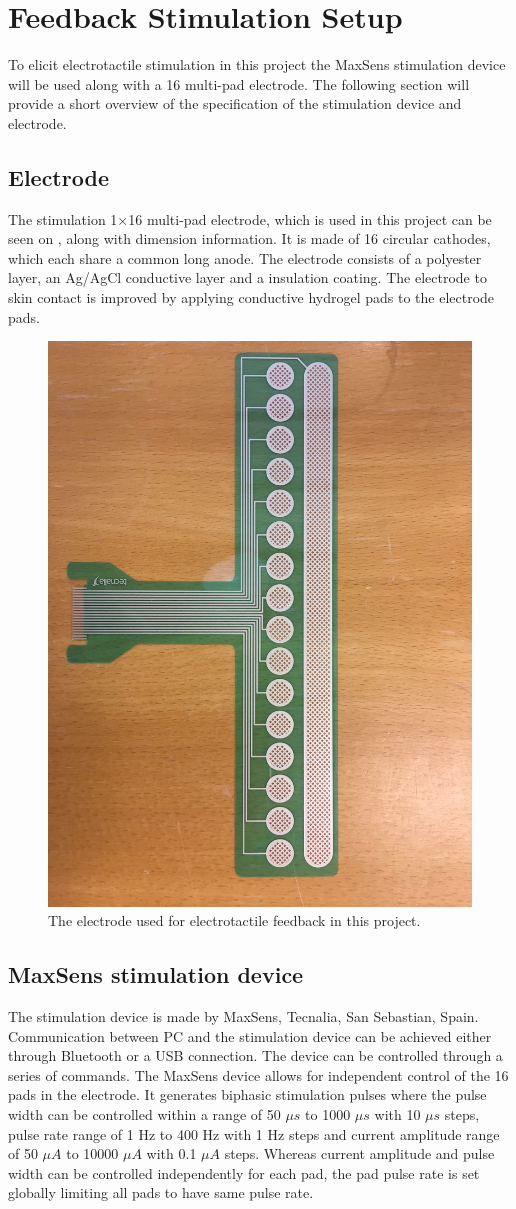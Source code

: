 \section{Feedback Stimulation Setup}

To elicit electrotactile stimulation in this project the MaxSens stimulation device will be used along with a 16 multi-pad electrode. The following section will provide a short overview of the specification of the stimulation device and electrode. 
 

\subsection{Electrode}

The stimulation 1$\times$16 multi-pad electrode, which is used in this project can be seen on , along with dimension information. It is made of 16 circular cathodes, which each share a common long anode. The electrode consists of a polyester layer, an Ag/AgCl conductive layer and a insulation coating. The electrode to skin contact is improved by applying conductive hydrogel pads to the electrode pads. \cite{Strbac2016}     

\begin{figure}[H]                 
	\includegraphics[width=.4\textwidth]{figures/electrode}  
	\caption{The electrode used for electrotactile feedback in this project.}
	\label{fig:electrode} 
\end{figure}


\subsection{MaxSens stimulation device}

The stimulation device is made by MaxSens, Tecnalia, San Sebastian, Spain. Communication between PC and the stimulation device can be achieved either through Bluetooth or a USB connection. The device can be controlled through a series of commands. The MaxSens device allows for independent control of the 16 pads in the electrode. It generates biphasic stimulation pulses where the pulse width can be controlled within a range of 50 $\mu s$ to 1000 $\mu s$ with 10 $\mu s$ steps, pulse rate range of 1 Hz to 400 Hz with 1 Hz steps and current amplitude range of 50 $\mu A$ to 10000 $\mu A$ with 0.1 $\mu A$ steps. Whereas current amplitude and pulse width can be controlled independently for each pad, the pad pulse rate is set globally limiting all pads to have same pulse rate.    